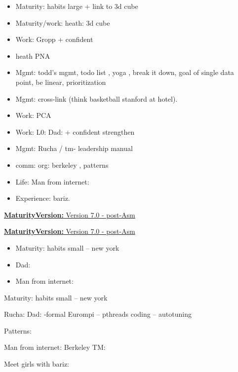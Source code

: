 \documentclass[11pt]{article}
\newcommand{\newMaturityVersion}[1]{\underline{\textbf{MaturityVersion:} #1} }
\begin{document}
\begin{itemize} 
\item Maturity: habits large + link to 3d cube 
\item Maturity/work: heath: 3d cube 
\item Work:  Gropp + confident 
\item heath PNA 
\item Mgmt: todd's mgmt, todo list , yoga , break it down, goal of single data point, be linear, prioritization 
\item Mgmt: cross-link (think basketball stanford at hotel). 

\item Work: PCA
\item Work: L0: Dad: + confident strengthen 
\item Mgmt: Rucha / tm- leadership manual 

\item comm: org: berkeley , patterns 
\item Life: Man from internet: 
\item Experience: bariz. 
\end{itemize}


\newMaturityVersion{Version 7.0 - post-Asm}


\newMaturityVersion{Version 7.0 - post-Asm}
\begin{itemize} 
\item Maturity: habits small – new york 
\item Dad: 
\item Man from internet: 
\end{itemize} 



Maturity: habits small – new york 

Rucha: 
Dad: 
 -formal 
Eurompi – pthreads coding – autotuning 

Patterns: 

Man from internet: 
Berkeley TM: 

Meet girls with bariz: 
\end{document}
